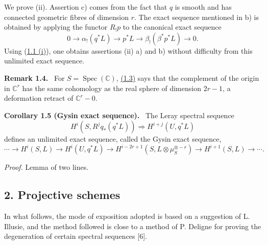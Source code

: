 \documentclass[11pt]{article}
\newenvironment{statement}[1]{\par\medskip\noindent\textbf{#1.}\ }{\par\medskip}
\begin{document}
We prove (ii). Assertion c) comes from the fact that $q$ is smooth and has connected geometric fibres of dimension $r$. The exact sequence mentioned in b) is obtained by applying the functor $R_!p$ to the canonical exact sequence
\[
0\longrightarrow \alpha_!(q^*L)\longrightarrow p^*L\longrightarrow \beta_!(\beta^*p^*L)\longrightarrow 0.
\]
Using (\hyperref[sga5:VII:proposition:1.1]{1.1 (i)}), one obtains assertions (ii) a) and b) without difficulty from this unlimited exact sequence.

\label{sga5:VII:remark:1.4}\begin{statement}{Remark 1.4}
For $S=\operatorname{Spec}(\mathbb C)$, \hyperref[sga5:VII:proposition:1.3]{(1.3)} says that the complement of the origin in $\mathbb C^r$ has the same cohomology as the real sphere of dimension $2r-1$, a deformation retract of $\mathbb C^r-0$.
\end{statement}

\label{sga5:VII:corollary:1.5}\begin{statement}{Corollary 1.5 (Gysin exact sequence)}
The Leray spectral sequence
\[
H^i(S,R^j q_*(q^*L))\Rightarrow H^{i+j}(U,q^*L)
\]
defines an unlimited exact sequence, called the Gysin exact sequence,
\[
\cdots\longrightarrow H^i(S,L)\longrightarrow H^i(U,q^*L)\longrightarrow
H^{i-2r+1}(S,L\otimes\mu_S^{\otimes -r})\longrightarrow H^{i+1}(S,L)\longrightarrow\cdots.
\]
\end{statement}

\emph{Proof.} Lemma of two lines.

\subsection*{2. Projective schemes}\label{sga5:VII:subsection:2}

In what follows, the mode of exposition adopted is based on a suggestion of L. Illusie, and the method followed is close to a method of P. Deligne for proving the degeneration of certain spectral sequences [6].
\end{document}
